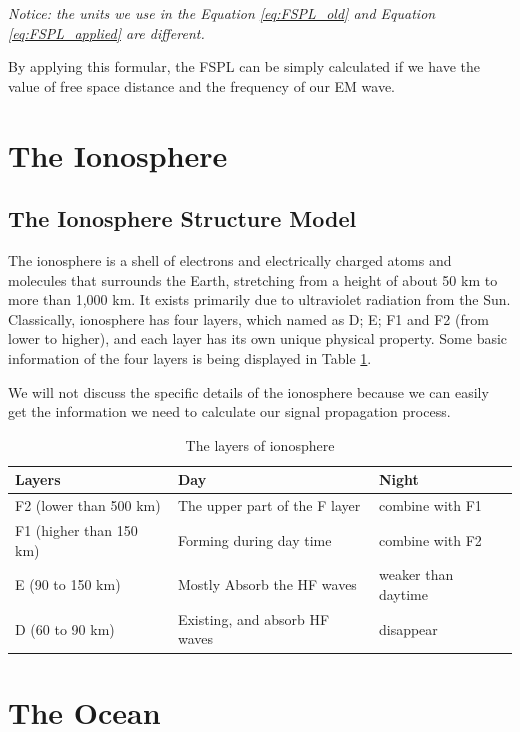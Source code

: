 \documentclass{mcmthesis}
\begin{document}
      \emph{Notice: the units we use in the Equation \ref{eq:FSPL_old} and Equation \ref{eq:FSPL_applied} are different.}

      By applying this formular, the FSPL can be simply calculated if we have the value of free space distance and the frequency of our EM wave.

\section{The Ionosphere}

  \subsection{The Ionosphere Structure Model}
    The ionosphere is a shell of electrons and electrically charged atoms and molecules that surrounds the Earth, stretching from a height of about 50 km to more than 1,000 km. It exists primarily due to ultraviolet radiation from the Sun. Classically, ionosphere has four layers, which named as D; E; F1 and F2 (from lower to higher), and each layer has its own unique physical property.\cite{davies1990ionospheric} Some basic information of the four layers is being displayed in Table \ref{tab: the ionosphere layers}.

    We will not discuss the specific details of the ionosphere because we can easily get the information we need to calculate our signal propagation process.

    \begin{table}
      \centering
        \begin{tabular}{|l|l|l|}
        \hline
        Layers                  &Day & Night      \\ \hline
        F2 (lower than 500 km)  & The upper part of the F layer & combine with F1          \\ \hline
        F1 (higher than 150 km) & Forming during day time       & combine with F2    \\ \hline
        E  (90 to 150 km)       & Mostly Absorb the HF waves & weaker than daytime          \\ \hline
        D  (60 to 90 km)        & Existing, and absorb HF waves &disappear  \\ \hline
        \end{tabular}
        \caption{The layers of ionosphere}
        \label{tab: the ionosphere layers}
    \end{table}

\section{The Ocean}
\end{document}
